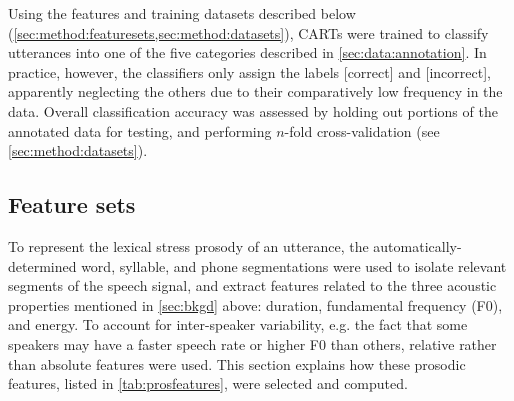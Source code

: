 \documentclass[a4paper]{article}
\newcommand{\TODO}[1]{{\color{red}\textbf{[TODO #1]}}}
\begin{document}

		Using the features and training datasets described below (\cref{sec:method:featuresets,sec:method:datasets}), CARTs were trained to classify utterances into one of the five categories described in \cref{sec:data:annotation}. 
		In practice, however, the classifiers only assign the labels [correct] and [incorrect], apparently neglecting the others due to their comparatively low frequency in the data. 
		Overall classification accuracy %
		 was assessed by holding out portions of the annotated data for testing, and performing $n$-fold cross-validation (see \cref{sec:method:datasets}). 
	
	
	    \subsection{Feature sets}
	    \label{sec:method:featuresets}
	    
	    To represent the lexical stress prosody of an utterance, the automatically-determined word, syllable, and phone segmentations were used to isolate relevant segments of the speech signal, and extract features related to the three acoustic properties mentioned in \cref{sec:bkgd} above: duration, fundamental frequency (F0), and energy. To account for inter-speaker variability, e.g. the fact that some speakers may have a faster speech rate or higher F0 than others, relative rather than absolute features were used. This section explains how these prosodic features, listed in \cref{tab:prosfeatures}, were selected and computed.
	    
\end{document}
